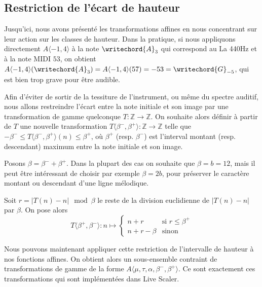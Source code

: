 \subsection{Restriction de l'écart de hauteur}
Jusqu'ici, nous avons présenté les transformations affines en nous concentrant sur leur action sur les classes de hauteur. Dans la pratique, si nous appliquons directement $A\langle -1,4 \rangle$ à la note  $\writechord{A}_3$ qui correspond au La 440Hz et à la note MIDI $53$, on obtient $A\langle -1,4 \rangle(\writechord{A}_3) = A\langle -1,4 \rangle(57) = -53 = \writechord{G}_{-5}$, qui est bien trop grave pour être audible. 

Afin d'éviter de sortir de la tessiture de l'instrument, ou même du spectre auditif, nous allons restreindre l'écart entre la note initiale et son image par une transformation de gamme quelconque $T : \mathbb{Z}\rightarrow \mathbb{Z}$. On souhaite alors définir à partir de $T$ une nouvelle transformation $T\langle \beta^-, \beta^+\rangle : \mathbb{Z}\rightarrow \mathbb{Z}$ telle que $ - \beta^- \leq T\langle \beta^-, \beta^+\rangle(n) \leq \beta ^+$, où $\beta^+$ (resp. $\beta^-$) est l'interval montant (resp. descendant) maximum entre la note initiale et son image.

Posons $\beta = \beta^- + \beta^+$. Dans la plupart des cas on souhaite que $\beta = b = 12$, mais il peut être intéressant de choisir par exemple $\beta  = 2b$, pour préserver le caractère montant ou descendant d'une ligne mélodique.

Soit $r = |T(n) - n | \mod \beta$ le reste de la division euclidienne de  $|T(n) - n |$ par $\beta$. On pose alors 
$$
T\langle \beta^+, \beta^- \rangle : n \mapsto \begin{cases}
  n + r & \text{si $r \leq \beta^+$}\\
  n + r - \beta & \text{sinon}
\end{cases}
$$

Nous pouvons maintenant appliquer cette restriction de l'intervalle de hauteur à nos fonctions affines. On obtient alors un sous-ensemble contraint de transformations de gamme de la forme $A\langle \mu, \tau, \alpha, \beta^-, \beta^+\rangle$. Ce sont exactement ces transformations qui sont implémentées dans Live Scaler.
  

